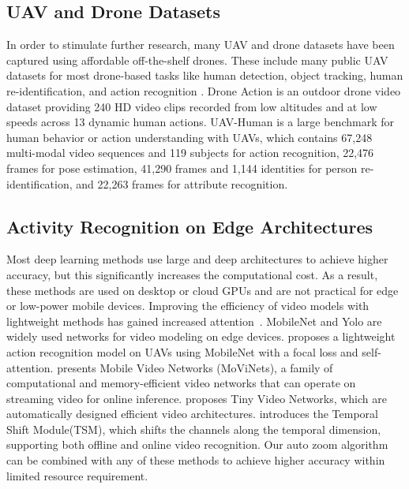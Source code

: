 \documentclass[letterpaper, 10 pt, conference]{ieeeconf}
\begin{document}
\subsection{UAV and Drone Datasets}
In order to stimulate further research, many UAV and drone datasets have been captured using affordable off-the-shelf drones. These include many public UAV datasets for most drone-based tasks like human detection, object tracking, human re-identification, and action recognition \cite{li2021uav,du2018unmanned,zhu2020detection,perera2018uav,perera2019drone,choi2020unsupervised,de2020vision}. Drone Action\cite{perera2019drone} is an outdoor drone video dataset providing 240 HD video clips recorded from low altitudes and at low speeds across 13 dynamic human actions. 
UAV-Human\cite{li2021uav} is a large benchmark for human behavior or action understanding with UAVs, which contains 67,248 multi-modal video sequences and 119 subjects for action recognition, 22,476 frames for pose estimation, 41,290 frames and 1,144 identities for person re-identification, and 22,263 frames for attribute recognition. 

\subsection{Activity Recognition on Edge Architectures}
Most deep learning methods use large and deep architectures to achieve higher accuracy, but this significantly increases the computational cost. As a result, these methods are used on desktop or cloud GPUs and are not practical for edge or low-power mobile devices. Improving the efficiency of video models with lightweight methods has gained increased attention~\cite{fan2019more,bhardwaj2019efficient,chen2018big,li2020smallbignet,tran2019video}. MobileNet\cite{howard2017mobilenets} and Yolo\cite{redmon2016you} are widely used networks for video modeling on edge devices. \cite{ding2020lightweight} proposes a lightweight action recognition model on UAVs using MobileNet with a focal loss and self-attention. \cite{kondratyuk2021movinets} presents Mobile Video Networks (MoViNets), a family of computational and memory-efficient video networks that can operate on streaming video for online inference. \cite{piergiovanni2022tiny} proposes Tiny Video Networks, which are automatically designed efficient video architectures. \cite{lin2019tsm} introduces the Temporal Shift Module(TSM), which shifts the channels along the temporal dimension, supporting both offline and online video recognition. Our auto zoom algorithm can be combined with any of these methods to achieve higher accuracy within limited resource requirement.
\end{document}
